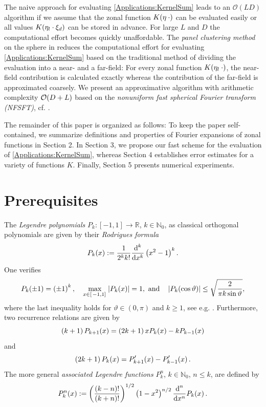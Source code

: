 \documentclass[11pt,a4paper,twoside,bibtotoc]{scrartcl}
\theoremstyle{plain}
\theoremstyle{definition}
\theoremstyle{remark}
\newcommand{\N}{\ensuremath{\mathbb{N}}}
\newcommand{\NZ}{\ensuremath{\mathbb{N}_{0}}}
\newcommand{\R}{\ensuremath{\mathbb{R}}}
\newcommand{\abs}[1]{\ensuremath{\left\vert#1\right\vert}}
\newcommand{\interv}[4]{\ensuremath{\left#1\left.#2,#3\right#4\right.}}
\newcommand{\fun}[2]{\ensuremath{#1{\hspace{-0.4ex}}\left(#2\right)}}
\newcommand{\paren}[1]{\ensuremath{\left(#1\right)}}
\newcommand{\bigo}[1]{\ensuremath{\mathcal{O}\paren{#1}}}
\newcommand{\mb}[1]{\mathbf{#1}}
\newcommand{\V}[1]{\mb{#1}}
\newcommand{\dx}{\text{\rm{d}}}
\numberwithin{equation}{section}
\numberwithin{table}{section}
\numberwithin{figure}{section}
\begin{document}
The naive approach for evaluating \eqref{Applications:KernelSum} leads to
an $\bigo{LD}$ algorithm if we assume that the zonal function
$\fun{K}{\V{\eta} \: \cdot}$ can be evaluated easily or all values
$\fun{K}{\V{\eta}_{l} \cdot \V{\xi}_{d}}$ can be stored in advance. 
For large $L$ and $D$ the computational effort becomes quickly unaffordable.
The \emph{panel clustering method} on the sphere in \cite{FrGlSch98} reduces the
computational effort for evaluating \eqref{Applications:KernelSum} based on the
traditional method of dividing the evaluation into a near- and a far-field:
For every zonal function $\fun{K}{\V{\eta}_l \: \cdot}$, the near-field
contribution is calculated exactly whereas the contribution of the far-field
is approximated coarsely.
We present an approximative algorithm with arithmetic complexity 
${\cal O} (D+L)$ based on the \emph{nonuniform fast spherical Fourier 
transform (NFSFT)}, cf. \cite{kupo02}. 

The remainder of this paper is organized as follows:
To keep the paper self-contained, we summarize definitions and properties
of Fourier expansions of zonal functions in Section 2.
In Section 3, we propose our fast scheme for the evaluation of
\eqref{Applications:KernelSum}, whereas Section 4 establishes
error estimates for a variety of functions $K$.
Finally, Section 5 presents numerical experiments.

\section{Prerequisites} \label{sect:2}

The \emph{Legendre polynomials} $P_k : \interv{[}{-1}{1}{]} \rightarrow \R$, $k \in
\N_{0}$, as classical orthogonal polynomials are given by their
\emph{Rodrigues formula} 
\[
\fun{P_k}{x} := \frac{1}{2^k k!} \frac{\dx^k}{\dx x^k} \paren{x^2-1}^k.
\]
One verifies
\begin{equation}\label{leg_prop}
\fun{P_{k}}{\pm1} = \paren{\pm1}^{k}, \quad
\max_{x \in \interv{[}{-1}{1}{]}} \abs{\fun{P_{k}}{x}} = 1,\text{ and} \quad
\left|\fun{P_{k}}{\cos\vartheta}\right| \le \sqrt{\frac{2}{\pi k
    \sin\vartheta}},
\end{equation}
where the last inequality holds for $\vartheta \in (0,\pi)$ and $k \ge 1$, see
e.g. \cite[pp. 47]{niuv}.
Furthermore, two recurrence relations are given by
\begin{equation}\label{three1}
\paren{k+1}\fun{P_{k+1}}{x} = \paren{2k+1}x\fun{P_{k}}{x} - k\fun{P_{k-1}}{x}
\end{equation}
and
\begin{equation}\label{three2}
\paren{2k+1} \fun{P_{k}}{x} = \fun{P_{k+1}'}{x} - \fun{P_{k-1}'}{x}.
\end{equation}
The more general \emph{associated Legendre functions} $P_{k}^n$, $k \in \NZ$, $n \le k$, are defined by
\[
  \fun{P_{k}^n}{x} := \left(\frac{(k-n)!}{(k+n)!}\right)^{1/2} 
  \left(1-x^2\right)^{n/2} \frac{\dx^n}{\dx x^n} \fun{P_{k}}{x}.
\]
\end{document}
